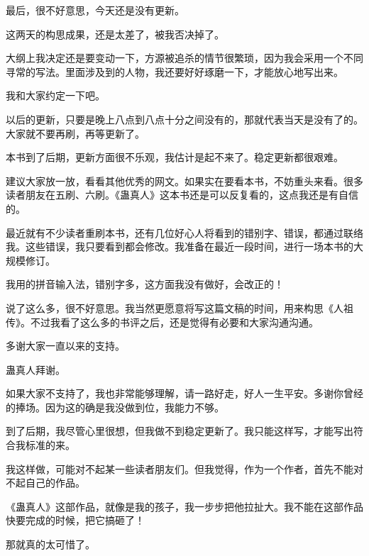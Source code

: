 \begin{this_body}
最后，很不好意思，今天还是没有更新。

这两天的构思成果，还是太差了，被我否决掉了。

大纲上我决定还是要变动一下，方源被追杀的情节很繁琐，因为我会采用一个不同寻常的写法。里面涉及到的人物，我还要好好琢磨一下，才能放心地写出来。

我和大家约定一下吧。

以后的更新，只要是晚上八点到八点十分之间没有的，那就代表当天是没有了的。大家就不要再刷，再等更新了。

本书到了后期，更新方面很不乐观，我估计是起不来了。稳定更新都很艰难。

建议大家放一放，看看其他优秀的网文。如果实在要看本书，不妨重头来看。很多读者朋友在五刷、六刷。《蛊真人》这本书还是可以反复看的，这点我还是有自信的。

最近就有不少读者重刷本书，还有几位好心人将看到的错别字、错误，都通过联络我。这些错误，我只要看到都会修改。我准备在最近一段时间，进行一场本书的大规模修订。

我用的拼音输入法，错别字多，这方面我没有做好，会改正的！

说了这么多，很不好意思。我当然更愿意将写这篇文稿的时间，用来构思《人祖传》。不过我看了这么多的书评之后，还是觉得有必要和大家沟通沟通。

多谢大家一直以来的支持。

蛊真人拜谢。

如果大家不支持了，我也非常能够理解，请一路好走，好人一生平安。多谢你曾经的捧场。因为这的确是我没做到位，我能力不够。

到了后期，我尽管心里很想，但我做不到稳定更新了。我只能这样写，才能写出符合我标准的来。

我这样做，可能对不起某一些读者朋友们。但我觉得，作为一个作者，首先不能对不起自己的作品。

《蛊真人》这部作品，就像是我的孩子，我一步步把他拉扯大。我不能在这部作品快要完成的时候，把它搞砸了！

那就真的太可惜了。

\end{this_body}
